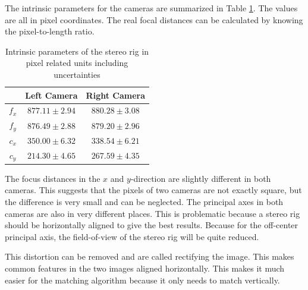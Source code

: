 The intrinsic parameters for the cameras are summarized in Table
\ref{chap3:tab-intrinsic-stereo}. The values are all in pixel coordinates. The real focal
distances can be calculated by knowing the pixel-to-length ratio.
\begin{table}[htbp]
  \centering
    \begin{tabular}{|c|c|c|} 
        \hline
                & Left Camera       & Right Camera \\
        \hline
        $f_x$   & $877.11\pm 2.94$  & $880.28\pm 3.08$  \\
        $f_y$   & $876.49\pm 2.88$  & $879.20\pm 2.96$  \\
        \hline
        $c_x$   & $350.00\pm 6.32$  & $338.54\pm 6.21$ \\
        $c_y$   & $214.30\pm 4.65$ & $267.59\pm 4.35$  \\
        \hline
    \end{tabular}
    \caption{Intrinsic parameters of the stereo rig in pixel related units including
    uncertainties}
    \label{chap3:tab-intrinsic-stereo}
\end{table}
The focus distances in the $x$ and $y$-direction are slightly different in both cameras. This
suggests that the pixels of two cameras are not exactly square, but the difference is very
small and can be neglected. The principal axes in both
cameras are also in very different places. This is problematic because a stereo rig should
be horizontally aligned to give the best results. Because for the off-center principal
axis, the field-of-view of the stereo rig will be quite reduced.

This distortion can be removed and are called rectifying the image. This makes common
features in the two images aligned horizontally. This makes it much easier for the matching
algorithm because it only needs to match vertically.

